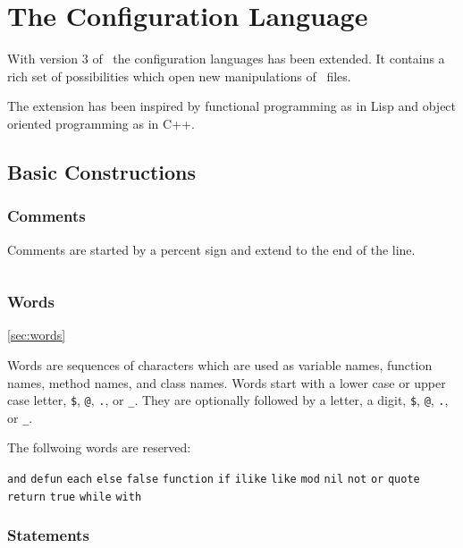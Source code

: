 \documentclass[11pt,a4paper]{scrbook}
\newcommand\keyword[1]{\texttt{#1}}
\begin{document}

\chapter{The  Configuration Language}

With version 3 of \BibTool\ the configuration languages has been extended. It
contains a rich set of possibilities which open new manipulations of \BibTeX\
files.

The extension has been inspired by functional programming as in Lisp and
object oriented programming as in C++.

\section{Basic Constructions}


\subsection{Comments}

Comments are started by a percent sign and extend to the end of the line.

\begin{lstlisting}[language=BibTool]
% this is a comment
\end{lstlisting}

\subsection{Words}\ref{sec:words}

Words are sequences of characters which are used as variable names, function
names, method names, and class names. Words start with a lower case or upper
case letter, \verb|$|, \verb|@|, \verb|.|, or \verb|_|. They are optionally
followed by a letter, a digit, \verb|$|, \verb|@|, \verb|.|, or \verb|_|.

The follwoing words are reserved:

\keyword{and}
\keyword{defun}
\keyword{each}
\keyword{else}
\keyword{false}
\keyword{function}
\keyword{if}
\keyword{ilike}
\keyword{like}
\keyword{mod}
\keyword{nil}
\keyword{not}
\keyword{or}
\keyword{quote}
\keyword{return}
\keyword{true}
\keyword{while}
\keyword{with}

\subsection{Statements}
\end{document}
